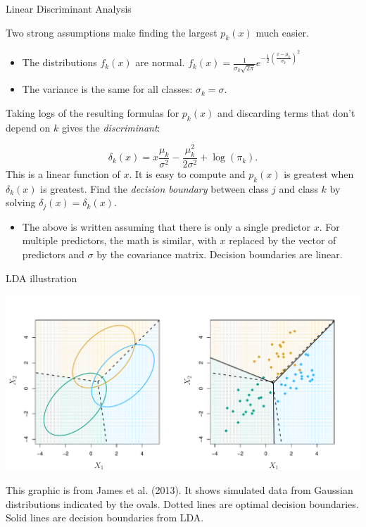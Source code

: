 \documentclass[
  ignorenonframetext,
]{beamer}
\providecommand{\tightlist}{%
  \setlength{\itemsep}{0pt}\setlength{\parskip}{0pt}}
\begin{document}
\begin{frame}{Linear Discriminant Analysis}
\protect\hypertarget{linear-discriminant-analysis}{}

Two strong assumptions make finding the largest \(p_k(x)\) much easier.

\begin{itemize}
\tightlist
\item
  The distributions \(f_k(x)\) are normal.
  \(f_k(x)=\frac{1}{\sigma_k\sqrt{2\pi}}e^{-\frac{1}{2}\left(\frac{x-\mu_k}{\sigma_k}\right)^2}\)
\item
  The variance is the same for all classes: \(\sigma_k=\sigma\).
\end{itemize}

Taking logs of the resulting formulas for \(p_k(x)\) and discarding
terms that don't depend on \(k\) gives the \emph{discriminant}:

\[
\delta_k(x)=x\frac{\mu_k}{\sigma^2} - \frac{\mu_k^2}{2\sigma^2}+\log(\pi_k).
\] This is a linear function of \(x\). It is easy to compute and
\(p_k(x)\) is greatest when \(\delta_k(x)\) is greatest. Find the
\emph{decision boundary} between class \(j\) and class \(k\) by solving
\(\delta_j(x)=\delta_k(x)\).

\begin{itemize}
\tightlist
\item
  The above is written assuming that there is only a single predictor
  \(x\). For multiple predictors, the math is similar, with \(x\)
  replaced by the vector of predictors and \(\sigma\) by the covariance
  matrix. Decision boundaries are linear.
\end{itemize}

\end{frame}

\begin{frame}{LDA illustration}
\protect\hypertarget{lda-illustration}{}

\includegraphics{4.6.pdf}

This graphic is from James et al. (2013). It shows simulated data from
Gaussian distributions indicated by the ovals. Dotted lines are optimal
decision boundaries. Solid lines are decision boundaries from LDA.

\end{frame}
\end{document}
